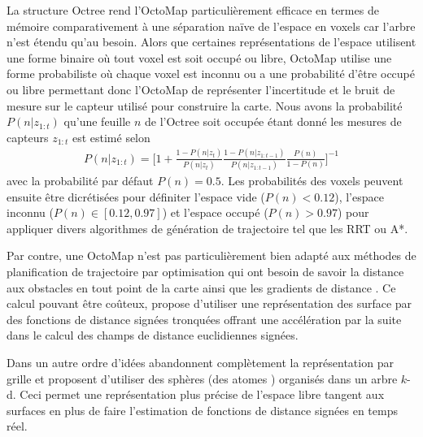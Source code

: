 La structure Octree rend l'OctoMap particulièrement efficace en termes de mémoire comparativement à une séparation naïve de l'espace en voxels car l'arbre n'est étendu qu'au besoin. Alors que certaines représentations de l'espace utilisent une forme binaire où tout voxel est soit occupé ou libre, OctoMap utilise une forme probabiliste où chaque voxel est inconnu ou a une probabilité d'être occupé ou libre permettant donc l'OctoMap de représenter l'incertitude et le bruit de mesure sur le capteur utilisé pour construire la carte. Nous avons la probabilité $P(n|z_{1:t})$ qu'une feuille $n$ de l'Octree soit occupée étant donné les mesures de capteurs $z_{1:t}$ est estimé selon
\begin{align}
  P(n|z_{1:t}) = \Bigg[ 1 +
    \frac{1 - P(n|z_{t})}{P(n|z_{t})}
    \frac{1 - P(n|z_{1:t-1})}{P(n|z_{1:t-1})}
    \frac{P(n)}{1 - P(n)}
  \Bigg]^{-1}
  \label{eq:octomap_probability}
\end{align}
avec la probabilité par défaut $P(n) = 0.5$. Les probabilités des voxels peuvent ensuite être dicrétisées pour définiter l'espace vide ($P(n) < 0.12$), l'espace inconnu ($P(n) \in [0.12, 0.97]$) et l'espace occupé ($P(n) > 0.97$) pour appliquer divers algorithmes de génération de trajectoire tel que les RRT ou A*.

Par contre, une OctoMap n'est pas particulièrement bien adapté aux méthodes de planification de trajectoire par optimisation qui ont besoin de savoir la distance aux obstacles en tout point de la carte ainsi que les gradients de distance \citep{ratliff2009chomp, Oleynikova2016}. Ce calcul pouvant être coûteux, \cite{oleynikova2017voxblox} propose d'utiliser une représentation des surface par des fonctions de distance signées tronquées offrant une accélération par la suite dans le calcul des champs de distance euclidiennes signées.

Dans un autre ordre d'idées \cite{Fridovich-Keil2017AtomMap} abandonnent complètement la représentation par grille et proposent d'utiliser des sphères (des \guillemotleft atomes \guillemotright) organisés dans un arbre $k$-d. Ceci permet une représentation plus précise de l'espace libre tangent aux surfaces en plus de faire l'estimation de fonctions de distance signées en temps réel.



